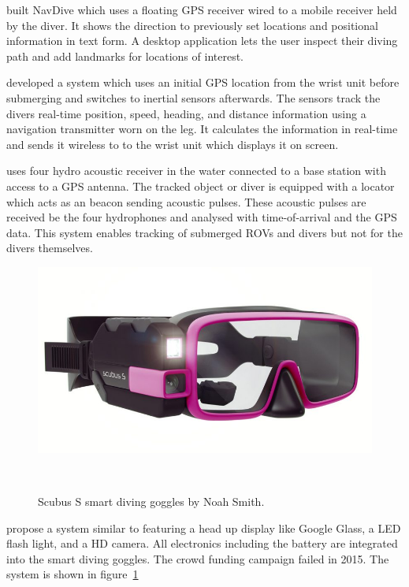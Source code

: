 \cite{navdive} built NavDive which uses a floating GPS receiver wired to a mobile receiver held by the diver. 
It shows the direction to previously set locations and positional information in text form. 
A desktop application lets the user inspect their diving path and add landmarks for locations of interest.

\cite{ariadna} developed a system which uses an initial GPS location from the wrist unit before submerging and switches to  inertial sensors afterwards.
The sensors track the divers real-time position, speed, heading, and distance information using a navigation transmitter worn on the leg.
It calculates the information in real-time and sends it wireless to to the wrist unit which displays it on screen.

\cite{waterlinked} uses four hydro acoustic receiver in the water connected to a base station with access to a GPS antenna. 
The tracked object or diver is equipped with a locator which acts as an beacon sending acoustic pulses. 
These acoustic pulses are received be the four hydrophones and analysed with time-of-arrival and the GPS data. This system enables tracking of submerged ROVs and divers but not for the divers themselves.

\begin{figure}
	\centering
	\includegraphics[width=\columnwidth]{images/scubusS.jpg}
	\caption{Scubus S smart diving goggles by Noah Smith.}~\label{fig:scubusS}
	\vspace{-2em}
\end{figure}

\cite{scubus} propose a system similar to featuring a head up display like Google Glass, a LED flash light, and a HD camera. 
All electronics including the battery are integrated into the smart diving goggles.
The crowd funding campaign failed in 2015.
The system is shown in figure~\ref{fig:scubusS} 


